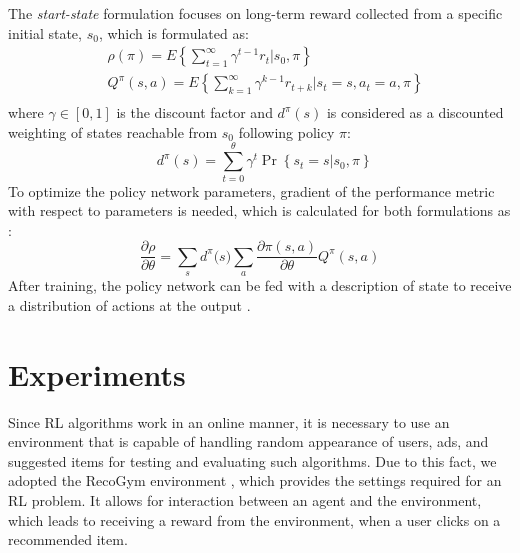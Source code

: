 \documentclass[journal]{IEEEtran}
\begin{document}
The \textit{start-state} formulation focuses on long-term reward collected from a specific initial state, $s_0$, which is formulated as:
\begin{equation}
\begin{aligned} 
 & \rho (\pi )=E\left\{ \sum\limits_{t=1}^{\infty }{{{\gamma }^{t-1}}{{r}_{t}}\left| {{s}_{0}},\pi  \right.} \right\} \\ 
 & {{Q}^{\pi }}(s,a)=E\left\{ \sum\limits_{k=1}^{\infty }{{{\gamma }^{k-1}}{{r}_{t+k}}|{{s}_{t}}=s,{{a}_{t}}=a,\pi } \right\} \\ 
\end{aligned} 
\label{eq5}
\end{equation}
where $\gamma \in [0,1]$ is the discount factor and $d^{\pi}(s)$ is considered as a discounted weighting of states reachable from $s_0$ following policy $\pi$:
\begin{equation}
\text{  }{{d}^{\pi }}(s)=\sum\limits_{t=0}^{\theta }{{{\gamma }^{t}}\Pr \left\{ {{s}_{t}}=s|{{s}_{0}},\pi  \right\}}
\label{eq6}
\end{equation}
To optimize the policy network parameters, gradient of the performance metric with respect to parameters is needed, which is calculated for both formulations as \cite{sutton2000policy}:  
\begin{equation}
\frac{\partial \rho }{\partial \theta }=\sum\limits_{s}{{{d}^{\pi }}(s})\sum\limits_{a}{\frac{\partial \pi (s,a)}{\partial \theta }}{{Q}^{\pi }}(s,a) 
\label{eq7}
\end{equation}
After training, the policy network can be fed with a description of state to receive a distribution of actions at the output \cite{mousavi2017traffic}.

\section{Experiments}

Since RL algorithms work in an online manner, it is necessary to use an environment that is capable of handling random appearance of users, ads, and suggested items for testing and evaluating such algorithms. Due to this fact, we adopted the RecoGym environment \cite{rohde2018recogym}, which provides the settings required for an RL problem. It allows for interaction between an agent and the environment, which leads to receiving a reward from the environment, when a user clicks on a recommended item.
\end{document}
